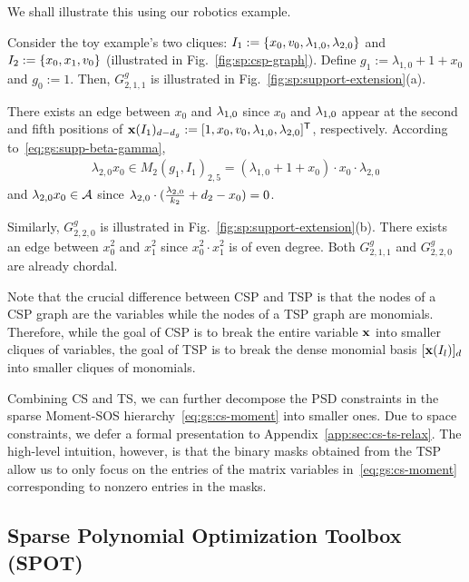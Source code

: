 

We shall illustrate this using our robotics example.

\begin{example}
	Consider the toy example's two cliques: $I_1 := \left\{x_0, v_0, \lambda_{1,0}, \lambda_{2,0}\right\}$ and $I_2 := \left\{x_0, x_1, v_0\right\}$ (illustrated in Fig.~\ref{fig:sp:csp-graph}). Define $g_1 := \lambda_{1,0} + 1 + x_0$ and $g_0 := 1$. Then, $G_{2,1,1}^g$ is illustrated in Fig.~\ref{fig:sp:support-extension}(a). 
    
    There exists an edge between $x_0$ and $\lam{1,0}$ since $x_0$ and $\lam{1,0}$ appear at the second and fifth positions of $\mathbf{x}(I_1)_{d - d_g} := [1, x_0, v_0, \lambda_{1,0}, \lambda_{2,0}]^{\mathsf{T}}$, respectively. According to~\eqref{eq:gs:supp-beta-gamma}, 
    \begin{align}
        \lambda_{2,0} x_0 \in M_2(g_1, I_1)_{2,5} = (\lambda_{1,0} + 1 + x_0) \cdot x_0 \cdot \lambda_{2,0} 
    \end{align}
    and $\lambda_{2,0} x_0 \in {\cal A}$ since $\lam{2}[0] \cdot (\frac{\lam{2}[0] }{k_2} + d_2 - \x[0]) = 0$. 
    
    Similarly, $G_{2,2,0}^g$ is illustrated in Fig.~\ref{fig:sp:support-extension}(b). There exists an edge between $x_0^2$ and $x_1^2$ since $x_0^2 \cdot x_1^2$ is of even degree. Both $G_{2,1,1}^g$ and $G_{2,2,0}^g$ are already chordal. 
\end{example}

Note that the crucial difference between CSP and TSP is that the nodes of a CSP graph are the variables while the nodes of a TSP graph are monomials. Therefore, while the goal of CSP is to break the entire variable $\mathbf{x}$ into smaller cliques of variables, the goal of TSP is to break the dense monomial basis $[\mathbf{x}(I_l)]_d$ into smaller cliques of monomials.

Combining CS and TS, we can further decompose the PSD constraints in the sparse Moment-SOS hierarchy~\eqref{eq:gs:cs-moment} into smaller ones. Due to space constraints, we defer a formal presentation to Appendix~\ref{app:sec:cs-ts-relax}. The high-level intuition, however, is that the binary masks obtained from the TSP allow us to only focus on the entries of the matrix variables in~\eqref{eq:gs:cs-moment} corresponding to nonzero entries in the masks.



\subsection{Sparse Polynomial Optimization Toolbox (SPOT)}
\label{sec:gs:spot}

